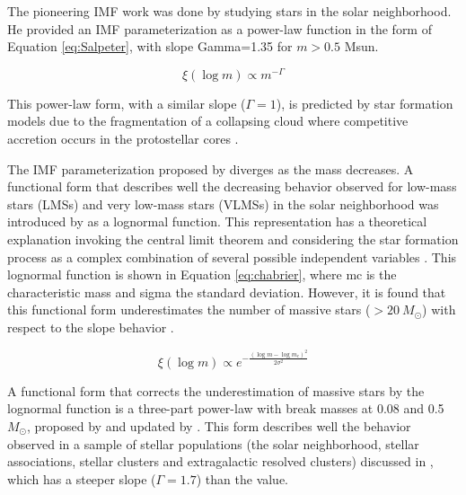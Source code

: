 \documentclass[12pt]{article}
\begin{document}
The pioneering IMF work was done by \citet{Salpeter1955} studying stars in the solar neighborhood. He provided an IMF parameterization as a power-law function in the form of Equation \ref{eq:Salpeter}, with slope \ac{Gamma}=1.35 for $m>0.5$ \ac{Msun}. 

\begin{equation}
	\xi(\log m)\propto m^{-\Gamma}
	\label{eq:Salpeter}
\end{equation}

This power-law form, with a similar slope ($\Gamma=1$), is predicted by star formation models due to the fragmentation of a collapsing cloud where competitive accretion occurs in the protostellar cores \citep{Larson1978,Zinnecker1982}.


The IMF parameterization proposed by \citet{Salpeter1955} diverges as the mass decreases. A functional form that describes well the decreasing behavior observed for low-mass stars (\ac{LMS}s) and very low-mass stars (\ac{VLMS}s) in the solar neighborhood was introduced by \citet{Miller-Scalo1979} as a lognormal function. This representation has a theoretical explanation invoking the central limit theorem and considering the star formation process as a complex combination of several possible independent variables \citep{Larson1973,Zinnecker1984,Adams-Fatuzzo1996}. This lognormal function is shown in Equation \ref{eq:chabrier}, where \ac{mc} is the characteristic mass and \ac{sigma} the standard deviation. However, it is found that this functional form underestimates the number of massive stars ($>20\ M_\odot$) with respect to the slope behavior \citep[e.g. ][]{Bastian2010}.

\begin{equation}
	\xi(\log m)\propto e^{-\frac{\left(\log m-\log m_c\right)^2}{2\sigma^2}}
	\label{eq:chabrier}
\end{equation}

A functional form that corrects the underestimation of massive stars by the lognormal function is a three-part power-law with break masses at 0.08 and 0.5 $M_\odot$, proposed by \citet{Kroupa1991,Kroupa1993} and updated by \citet{Kroupa2001b,Kroupa2002}. This form describes well the behavior observed in a sample of stellar populations (the solar neighborhood, stellar associations, stellar clusters and extragalactic resolved clusters) discussed in \citet{Scalo1986}, which has a steeper slope ($\Gamma=1.7$) than the \citet{Salpeter1955} value.
\end{document}

